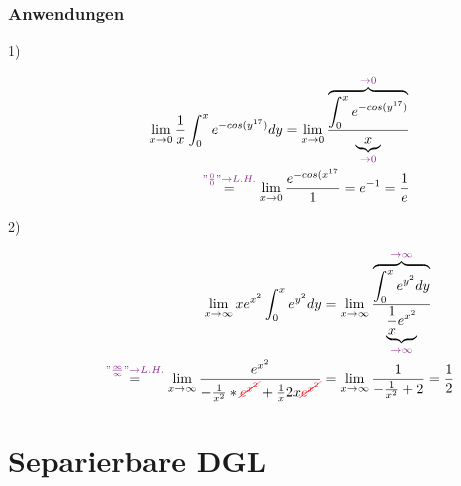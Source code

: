 \documentclass[12pt,a4paper]{article}%
\numberwithin{equation}{section}
\def\colBord#1{\begingroup\color{Fuchsia}{#1}\endgroup}
\def\colRed#1{\begingroup\color{Red}{#1}\endgroup}
\numberwithin{equation}{subsection}
\begin{document}
\subsubsection{Anwendungen}
\begin{description}
\item[1)]
\begin{align}
\lim_{x\to 0} \frac{1}{x} \int_0^x e^{-cos(y^{17})} dy = \lim_{x\to 0}  \frac{\overbrace{\int_0^x e^{-cos(y^{17})}}^{\colBord{\rightarrow 0}}}{\underbrace{x}_{\colBord{\rightarrow 0}}} \nonumber\\
\overset{\colBord{"\frac{0}{0}" \rightarrow L.H.}}{=}
\lim_{x \to 0} \frac{e^{-cos(x^{17}}}{1} = e^{-1} = \frac{1}{e}
\end{align}
\item[2)]
\begin{align}
\lim_{x \to \infty} xe^{x^2} \int_0^x e^{y^2}dy 
&= \lim_{x \to \infty} \frac{\overbrace{\int_0^x e^{y^2}dy}^{\colBord{\rightarrow \infty}}}
{\underbrace{\frac{1}{x} e^{x^2}}_{\colBord{\rightarrow \infty}}} \nonumber\\
\overset{\colBord{"\frac{\infty}{\infty}" \rightarrow L.H.}}{=}
\lim_{x \to \infty} \frac{e^{x^2}}{-\frac{1}{x^2}* \colRed{\cancel{e^{x^2}}}
+ \frac{1}{x} 2x \colRed{\cancel{e^{x^2}}}} 
&= \lim_{x \to \infty} \frac{1}{- \frac{1}{x^2} +2} = \frac{1}{2}
\end{align}
\end{description}
\colRed{Add rest of integrals here!}
\newpage

\section{Separierbare DGL}
\end{document}
